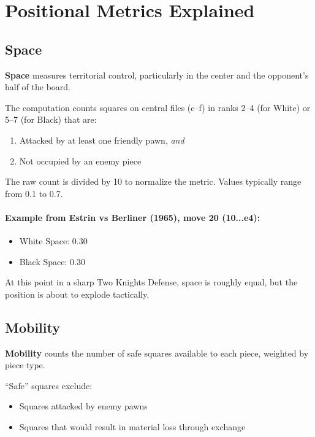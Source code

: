 \documentclass[12pt]{book}
\begin{document}
\section{Positional Metrics Explained}

\subsection{Space}

\textbf{Space} measures territorial control, particularly in the center and the opponent's half of the board.

The computation counts squares on central files (c--f) in ranks 2--4 (for White) or 5--7 (for Black) that are:
\begin{enumerate}
    \item Attacked by at least one friendly pawn, {\it and}
    \item Not occupied by an enemy piece
\end{enumerate}

The raw count is divided by 10 to normalize the metric. Values typically range from 0.1 to 0.7.

\paragraph{Example from Estrin vs Berliner (1965), move 20 (10...e4):}
\begin{itemize}
    \item White Space: 0.30
    \item Black Space: 0.30
\end{itemize}
At this point in a sharp Two Knights Defense, space is roughly equal, but the position is about to explode tactically.

\subsection{Mobility}

\textbf{Mobility} counts the number of safe squares available to each piece, weighted by piece type.

``Safe'' squares exclude:
\begin{itemize}
    \item Squares attacked by enemy pawns
    \item Squares that would result in material loss through exchange
\end{itemize}
\end{document}

